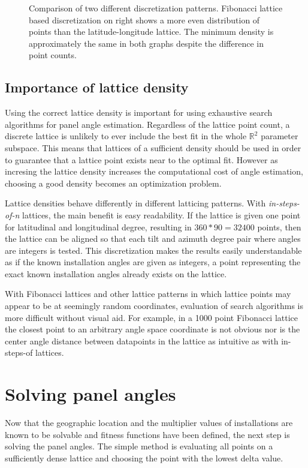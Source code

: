 \begin{figure}
\caption{Comparison of two different discretization patterns. Fibonacci lattice based discretization on right shows a more even distribution of points than the latitude-longitude lattice. The minimum density is approximately the same in both graphs despite the difference in point counts.}
     \label{fig_5stepfibolat}
\end{figure}

\newpage
\subsection{Importance of lattice density}\label{ss_lattice_density}
Using the correct lattice density is important for using exhaustive search algorithms for panel angle estimation. Regardless of the lattice point count, a discrete lattice is unlikely to ever include the best fit in the whole $\mathbb{R}^2$ parameter subspace. This means that lattices of a sufficient density should be used in order to guarantee that a lattice point exists near to the optimal fit. However as incresing the lattice density increases the computational cost of angle estimation, choosing a good density becomes an optimization problem.

Lattice densities behave differently in different latticing patterns. With \textit{in-steps-of-n} lattices, the main benefit is easy readability. If the lattice is given one point for latitudinal and longitudinal degree, resulting in $360*90=32400$ points, then the lattice can be aligned so that each tilt and azimuth degree pair where angles are integers is tested. This discretization makes the results easily understandable as if the known installation angles are given as integers, a point representing the exact known installation angles already exists on the lattice.

With Fibonacci lattices and other lattice patterns in which lattice points may appear to be at seemingly random coordinates, evaluation of search algorithms is more difficult without visual aid. For example, in a 1000 point Fibonacci lattice the closest point to an arbitrary angle space coordinate is not obvious nor is the center angle distance between datapoints in the lattice as intuitive as with in-steps-of lattices.


\newpage
\section{Solving panel angles}
Now that the geographic location and the multiplier values of installations are known to be solvable and fitness functions have been defined, the next step is solving the panel angles. The simple method is evaluating all points on a sufficiently dense lattice and choosing the point with the lowest delta value.

